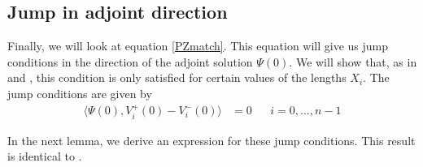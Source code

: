 \documentclass[thesis.tex]{subfiles}
\begin{document}
\subsection{Jump in adjoint direction}

Finally, we will look at equation \eqref{PZmatch}. This equation will give us jump conditions in the direction of the adjoint solution $\Psi(0)$. We will show that, as in \cite{Sandstede1998} and \cite{SandstedeStrut}, this condition is only satisfied for certain values of the lengths $X_i$. The jump conditions are given by
\begin{align}\label{PZmatch2}
\langle \Psi(0), V_i^+(0) - V_i^-(0) \rangle &= 0 && i = 0, \dots, n-1
\end{align}

In the next lemma, we derive an expression for these jump conditions. This result is identical to \cite[(3.9)]{SandstedeStrut}.

\end{document}
